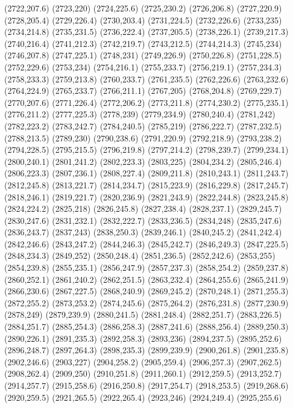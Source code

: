 (2722,207.6)
(2723,220)
(2724,225.6)
(2725,230.2)
(2726,206.8)
(2727,220.9)
(2728,205.4)
(2729,226.4)
(2730,203.4)
(2731,224.5)
(2732,226.6)
(2733,235)
(2734,214.8)
(2735,231.5)
(2736,222.4)
(2737,205.5)
(2738,226.1)
(2739,217.3)
(2740,216.4)
(2741,212.3)
(2742,219.7)
(2743,212.5)
(2744,214.3)
(2745,234)
(2746,207.8)
(2747,225.1)
(2748,231)
(2749,226.9)
(2750,226.8)
(2751,228.5)
(2752,229.6)
(2753,234)
(2754,216.1)
(2755,233.7)
(2756,219.1)
(2757,234.3)
(2758,233.3)
(2759,213.8)
(2760,233.7)
(2761,235.5)
(2762,226.6)
(2763,232.6)
(2764,224.9)
(2765,233.7)
(2766,211.1)
(2767,205)
(2768,204.8)
(2769,229.7)
(2770,207.6)
(2771,226.4)
(2772,206.2)
(2773,211.8)
(2774,230.2)
(2775,235.1)
(2776,211.2)
(2777,225.3)
(2778,239)
(2779,234.9)
(2780,240.4)
(2781,242)
(2782,223.2)
(2783,242.7)
(2784,240.5)
(2785,219)
(2786,222.7)
(2787,232.5)
(2788,213.5)
(2789,230)
(2790,238.6)
(2791,220.9)
(2792,218.9)
(2793,238.2)
(2794,228.5)
(2795,215.5)
(2796,219.8)
(2797,214.2)
(2798,239.7)
(2799,234.1)
(2800,240.1)
(2801,241.2)
(2802,223.3)
(2803,225)
(2804,234.2)
(2805,246.4)
(2806,223.3)
(2807,236.1)
(2808,227.4)
(2809,211.8)
(2810,243.1)
(2811,243.7)
(2812,245.8)
(2813,221.7)
(2814,234.7)
(2815,223.9)
(2816,229.8)
(2817,245.7)
(2818,246.1)
(2819,221.7)
(2820,236.9)
(2821,243.9)
(2822,244.8)
(2823,245.8)
(2824,224.2)
(2825,218)
(2826,245.8)
(2827,238.4)
(2828,237.1)
(2829,245.7)
(2830,247.6)
(2831,232.1)
(2832,222.7)
(2833,236.5)
(2834,248)
(2835,247.6)
(2836,243.7)
(2837,243)
(2838,250.3)
(2839,246.1)
(2840,245.2)
(2841,242.4)
(2842,246.6)
(2843,247.2)
(2844,246.3)
(2845,242.7)
(2846,249.3)
(2847,225.5)
(2848,234.3)
(2849,252)
(2850,248.4)
(2851,236.5)
(2852,242.6)
(2853,255)
(2854,239.8)
(2855,235.1)
(2856,247.9)
(2857,237.3)
(2858,254.2)
(2859,237.8)
(2860,252.1)
(2861,240.2)
(2862,251.5)
(2863,232.4)
(2864,255.6)
(2865,241.9)
(2866,230.6)
(2867,227.5)
(2868,240.9)
(2869,245.2)
(2870,248.1)
(2871,255.3)
(2872,255.2)
(2873,253.2)
(2874,245.6)
(2875,264.2)
(2876,231.8)
(2877,230.9)
(2878,249)
(2879,239.9)
(2880,241.5)
(2881,248.4)
(2882,251.7)
(2883,226.5)
(2884,251.7)
(2885,254.3)
(2886,258.3)
(2887,241.6)
(2888,256.4)
(2889,250.3)
(2890,226.1)
(2891,235.3)
(2892,258.3)
(2893,236)
(2894,237.5)
(2895,252.6)
(2896,248.7)
(2897,264.3)
(2898,235.3)
(2899,239.9)
(2900,261.8)
(2901,235.8)
(2902,246.6)
(2903,227)
(2904,258.2)
(2905,259.4)
(2906,257.3)
(2907,262.5)
(2908,262.4)
(2909,250)
(2910,251.8)
(2911,260.1)
(2912,259.5)
(2913,252.7)
(2914,257.7)
(2915,258.6)
(2916,250.8)
(2917,254.7)
(2918,253.5)
(2919,268.6)
(2920,259.5)
(2921,265.5)
(2922,265.4)
(2923,246)
(2924,249.4)
(2925,255.6)
